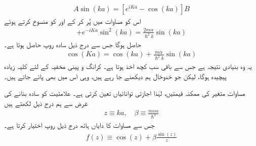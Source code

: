 \begin{align}\label{مساوات_متماثل_عمومی_حل_بلوخ_پ}
	A\sin(ka) = [e^{iKa}-\cos(ka)]B
\end{align}
اس کو مساوات   میں پُر کر کے  اور  کو منسوخ کرتے ہوئے  
\begin{align*}
	[e^{iKa}-\cos(ka)][1-e^{-iKa}\cos(ka)] + e^{-iKa}\sin^{2}(ka) = \frac{2m\alpha}{\hslash^{2}k}\sin(ka)
\end{align*}
حاصل ہوگا جس سے درج ذیل سادہ روپ حاصل ہوتا ہے۔
\begin{align}\label{مساوات_متماثل_سادہ_روپ_بلوخ}
	\cos(Ka) = \cos(ka) + \frac{m\alpha}{\hslash^{2}k}\sin(ka)
\end{align}
یہ  وہ  بنیادی نتیجہ ہے جس سے باقی سب کچھ اخذ ہوتا ہے۔ کرانگ و  پینی مخفیہ کے لئے کلیہ زیادہ پیچیدہ ہوگا،  لیکن جو خدوخال ہم دیکھنے جا رہے ہیں،  وہی اس میں بھی پائے جاتے ہیں۔

 مساوات  متغیر      کی ممکنہ  قیمتیں،  لہٰذا اجازتی توانائیاں تعین کرتی ہے۔ علامتیت کو سادہ بنانے کی  غرض سے ہم درج ذیل لکھتے ہیں 
\begin{align}
	z \equiv ka, \quad  \beta \equiv \frac{m\alpha a}{\hslash^{2}}
\end{align}
جس سے مساوات     کا دایاں ہاتھ درج ذیل روپ اختیار کرتا ہے۔
\begin{align}\label{مساوات_متماثل_بے_بعدی_ناپ}
	f(z) \equiv \cos(z) + \beta\frac{\sin(z)}{z}
\end{align}

